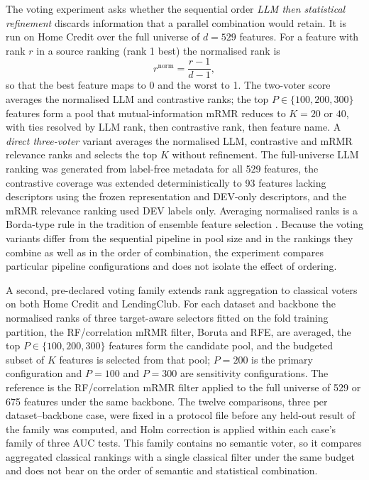 \documentclass[final,5p,twocolumn]{elsarticle}
\newcommand{\Kfeat}{K}
\begin{document}
The voting experiment asks whether the sequential order \emph{LLM then statistical refinement} discards information that a parallel combination would retain. It is run on Home Credit over the full universe of $d=529$ features. For a feature with rank $r$ in a source ranking (rank 1 best) the normalised rank is
\begin{equation}
    r^{\mathrm{norm}}=\frac{r-1}{d-1},
    \label{eq:normrank}
\end{equation}
so that the best feature maps to 0 and the worst to 1. The two-voter score averages the normalised LLM and contrastive ranks; the top $P\in\{100,200,300\}$ features form a pool that mutual-information mRMR reduces to $\Kfeat=20$ or $40$, with ties resolved by LLM rank, then contrastive rank, then feature name. A \emph{direct three-voter} variant averages the normalised LLM, contrastive and mRMR relevance ranks and selects the top $\Kfeat$ without refinement. The full-universe LLM ranking was generated from label-free metadata for all 529 features, the contrastive coverage was extended deterministically to 93 features lacking descriptors using the frozen representation and DEV-only descriptors, and the mRMR relevance ranking used DEV labels only. Averaging normalised ranks is a Borda-type rule \cite{dwork2001} in the tradition of ensemble feature selection \cite{saeys2008}. Because the voting variants differ from the sequential pipeline in pool size and in the rankings they combine as well as in the order of combination, the experiment compares particular pipeline configurations and does not isolate the effect of ordering.

A second, pre-declared voting family extends rank aggregation to classical voters on both Home Credit and LendingClub. For each dataset and backbone the normalised ranks of three target-aware selectors fitted on the fold training partition, the RF/correlation mRMR filter, Boruta and RFE, are averaged, the top $P\in\{100,200,300\}$ features form the candidate pool, and the budgeted subset of $\Kfeat$ features is selected from that pool; $P=200$ is the primary configuration and $P=100$ and $P=300$ are sensitivity configurations. The reference is the RF/correlation mRMR filter applied to the full universe of 529 or 675 features under the same backbone. The twelve comparisons, three per dataset--backbone case, were fixed in a protocol file before any held-out result of the family was computed, and Holm correction is applied within each case's family of three AUC tests. This family contains no semantic voter, so it compares aggregated classical rankings with a single classical filter under the same budget and does not bear on the order of semantic and statistical combination.
\end{document}
